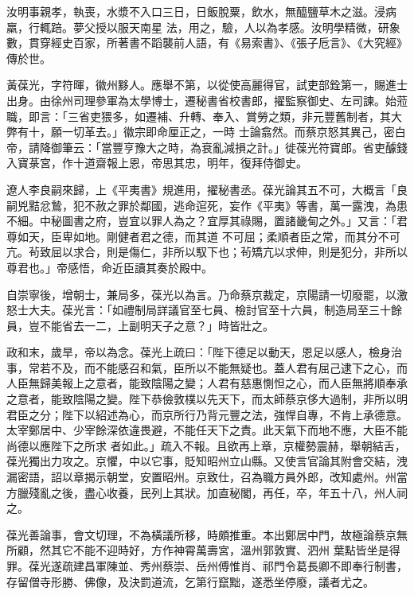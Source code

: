\begin{pinyinscope}
 汝明事親孝，執喪，水漿不入口三日，日飯脫粟，飲水，無醯鹽草木之滋。浸病羸，行輒踣。夢父授以服天南星
 法，用之，驗，人以為孝感。汝明學精微，研象數，貫穿經史百家，所著書不蹈襲前人語，有《易索書》、《張子卮言》、《大究經》傳於世。



 黃葆光，字符暉，徽州黟人。應舉不第，以從使高麗得官，試吏部銓第一，賜進士出身。由徐州司理參軍為太學博士，遷秘書省校書郎，擢監察御史、左司諫。始蒞職，即言：「三省吏猥多，如遷補、升轉、奉入、賞勞之類，非元豐舊制者，其大弊有十，願一切革去。」徽宗即命厘正之，一時
 士論翕然。而蔡京怒其異己，密白帝，請降御筆云：「當豐亨豫大之時，為衰亂減損之計。」徙葆光符寶郎。省吏醵錢入寶菉宮，作十道齋報上恩，帝思其忠，明年，復拜侍御史。



 遼人李良嗣來歸，上《平夷書》規進用，擢秘書丞。葆光論其五不可，大概言「良嗣兇黠忿鷙，犯不赦之罪於鄰國，逃命逭死，妄作《平夷》等書，萬一露洩，為患不細。中秘圖書之府，豈宜以罪人為之？宜厚其祿賜，置諸畿甸之外。」又言：「君尊如天，臣卑如地。剛健者君之德，而其道
 不可屈；柔順者臣之常，而其分不可亢。茍致屈以求合，則是傷仁，非所以馭下也；茍矯亢以求伸，則是犯分，非所以尊君也。」帝感悟，命近臣讀其奏於殿中。



 自崇寧後，增朝士，兼局多，葆光以為言。乃命蔡京裁定，京陽請一切廢罷，以激怒士大夫。葆光言：「如禮制局詳議官至七員、檢討官至十六員，制造局至三十餘員，豈不能省去一二，上副明天子之意？」時皆壯之。



 政和末，歲旱，帝以為念。葆光上疏曰：「陛下德足以動天，恩足以感人，檢身治
 事，常若不及，而不能感召和氣，臣所以不能無疑也。蓋人君有屈己逮下之心，而人臣無歸美報上之意者，能致陰陽之變；人君有慈惠惻怛之心，而人臣無將順奉承之意者，能致陰陽之變。陛下恭儉敦樸以先天下，而太師蔡京侈大過制，非所以明君臣之分；陛下以紹述為心，而京所行乃背元豐之法，強悍自專，不肯上承德意。太宰鄭居中、少宰餘深依違畏避，不能任天下之責。此天氣下而地不應，大臣不能尚德以應陛下之所求
 者如此。」疏入不報。且欲再上章，京權勢震赫，舉朝結舌，葆光獨出力攻之。京懼，中以它事，貶知昭州立山縣。又使言官論其附會交結，洩漏密語，詔以章揭示朝堂，安置昭州。京致仕，召為職方員外郎，改知處州。州當方臘殘亂之後，盡心收養，民列上其狀。加直秘閣，再任，卒，年五十八，州人祠之。



 葆光善論事，會文切理，不為橫議所移，時頗推重。本出鄭居中門，故極論蔡京無所顧，然其它不能不迎時好，方作神霄萬壽宮，溫州郭敦實、泗州
 葉點皆坐是得罪。葆光遂疏建昌軍陳並、秀州蔡崇、岳州傅惟肖、祁門令葛長卿不即奉行制書，存留僧寺形勝、佛像，及決罰道流，乞第行竄黜，遂悉坐停廢，議者尤之。




\end{pinyinscope}
